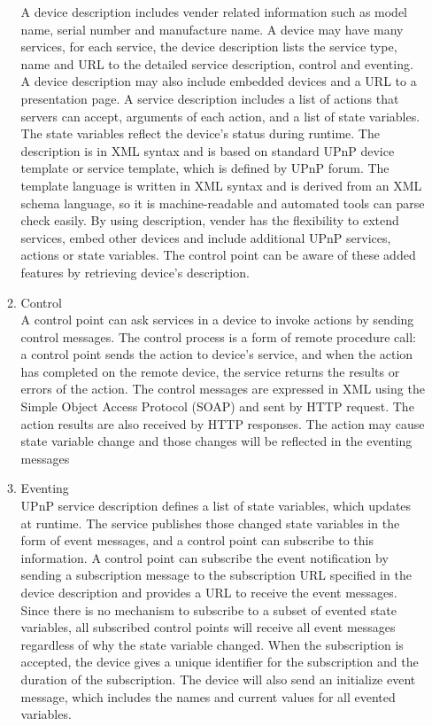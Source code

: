 \begin{enumerate}
\begin{enumerate}
A device description includes vender related information such as model name, serial number and manufacture name. A device may have many services, for each service, the device description lists the service type, name and URL to the detailed service description, control and eventing. A device description may also include embedded devices and a URL to a presentation page.
A service description includes a list of actions that servers can accept, arguments of each action, and a list of state variables. The state variables reflect the device's status during runtime.
The description is in XML syntax and is based on standard UPnP device template or service template, which is defined by UPnP forum. The template language is written in XML syntax and is derived from an XML schema language, so it is machine-readable and automated tools can parse check easily.
By using description, vender has the flexibility to extend services, embed other devices and include additional UPnP services, actions or state variables. The control point can be aware of these added features by retrieving device's description.
\item Control \\
A control point can ask services in a device to invoke actions by sending control messages. The control process is a form of remote procedure call: a control point sends the action to device's service, and when the action has completed on the remote device, the service returns the results or errors of the action.
The control messages are expressed in XML using the Simple Object Access Protocol (SOAP) and sent by HTTP request. The action results are also received by HTTP responses. The action may cause state variable change and those changes will be reflected in the eventing messages
\item Eventing \\
UPnP service description defines a list of state variables, which updates at runtime. The service publishes those changed state variables in the form of event messages, and a control point can subscribe to this information.
A control point can subscribe the event notification by sending a subscription message to the subscription URL specified in the device description and provides a URL to receive the event messages.
Since there is no mechanism to subscribe to a subset of evented state variables, all subscribed control points will receive all event messages regardless of why the state variable changed. 
When the subscription is accepted, the device gives a unique identifier for the subscription and the duration of the subscription. The device will also send an initialize event message, which includes the names and current values for all evented variables.

\end{enumerate}
\end{enumerate}
